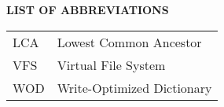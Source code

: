 {}

\begin{center}
\textbf{LIST OF ABBREVIATIONS}
\vspace{16pt}
\end{center}


\noindent
\begin{tabular}{p{0.8in} p{5in}}
LCA     & Lowest Common Ancestor\\
VFS     & Virtual File System\\
WOD     & Write-Optimized Dictionary\\
\end{tabular}

\clearpage
